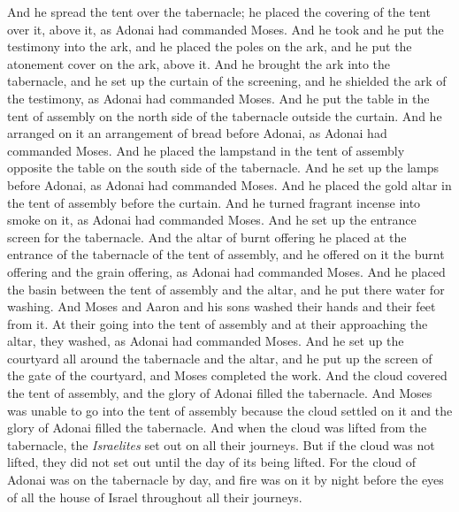 \begin{biblechapter}
\verse And he spread the tent over the tabernacle; he placed the covering of the tent over it, above it, as Adonai had commanded Moses.
\verse And he took and he put the testimony into the ark, and he placed the poles on the ark, and he put the atonement cover on the ark, above it.
\verse And he brought the ark into the tabernacle, and he set up the curtain of the screening, and he shielded the ark of the testimony, as Adonai had commanded Moses.
\verse And he put the table in the tent of assembly on the north side of the tabernacle outside the curtain.
\verse And he arranged on it an arrangement of bread before Adonai, as Adonai had commanded Moses.
\verse And he placed the lampstand in the tent of assembly opposite the table on the south side of the tabernacle.
\verse And he set up the lamps before Adonai, as Adonai had commanded Moses.
\verse And he placed the gold altar in the tent of assembly before the curtain.
\verse And he turned fragrant incense into smoke on it, as Adonai had commanded Moses.
\verse And he set up the entrance screen for the tabernacle.
\verse And the altar of burnt offering he placed at the entrance of the tabernacle of the tent of assembly, and he offered on it the burnt offering and the grain offering, as Adonai had commanded Moses.
\verse And he placed the basin between the tent of assembly and the altar, and he put there water for washing.
\verse And Moses and Aaron and his sons washed their hands and their feet from it.
\verse At their going into the tent of assembly and at their approaching the altar, they washed, as Adonai had commanded Moses.
\verse And he set up the courtyard all around the tabernacle and the altar, and he put up the screen of the gate of the courtyard, and Moses completed the work.
\verse And the cloud covered the tent of assembly, and the glory of Adonai filled the tabernacle.
\verse And Moses was unable to go into the tent of assembly because the cloud settled on it and the glory of Adonai filled the tabernacle.
\verse And when the cloud was lifted from the tabernacle, the \textit{Israelites} set out on all their journeys.
\verse But if the cloud was not lifted, they did not set out until the day of its being lifted.
\verse For the cloud of Adonai was on the tabernacle by day, and fire was on it by night before the eyes of all the house of Israel throughout all their journeys.
\end{biblechapter}


